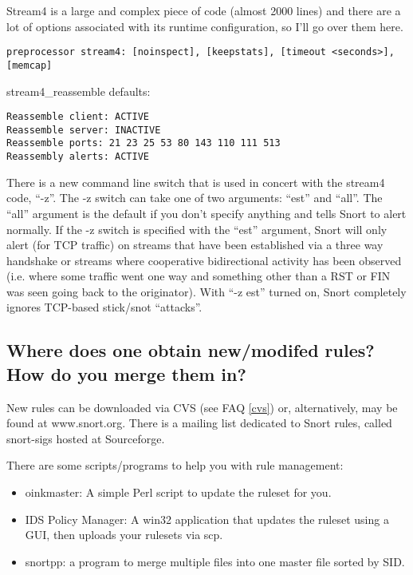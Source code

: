 \documentclass{article}
\newcommand{\myref}[1]{(see FAQ \ref{#1})}
\begin{document}
Stream4 is a large and complex piece of code (almost 2000 lines) and there are a lot of options associated with its runtime configuration, so I'll go over them here.

\begin{verbatim}
preprocessor stream4: [noinspect], [keepstats], [timeout <seconds>], [memcap]
\end{verbatim}

stream4\_reassemble defaults: 
\begin{verbatim}
Reassemble client: ACTIVE 
Reassemble server: INACTIVE 
Reassemble ports: 21 23 25 53 80 143 110 111 513 
Reassembly alerts: ACTIVE 
\end{verbatim}

There is a new command line switch that is used in concert with the
stream4 code, ``-z''.  The -z switch can take one of two arguments: ``est''
and ``all''.  The ``all'' argument is the default if you don't specify
anything and tells Snort to alert normally.  If the -z switch is
specified with the ``est'' argument, Snort will only alert (for TCP
traffic) on streams that have been established via a three way handshake
or streams where cooperative bidirectional activity has been observed
(i.e. where some traffic went one way and something other than a RST or
FIN was seen going back to the originator).  With ``-z est'' turned on,
Snort completely ignores TCP-based stick/snot ``attacks''.

\subsection{Where does one obtain new/modifed rules? How do you merge them in?}

New rules can be downloaded via CVS \myref{cvs} or, alternatively, may be 
found at www.snort.org. There is a mailing list dedicated to Snort rules, 
called snort-sigs hosted at Sourceforge.

There are some scripts/programs to help you with rule management:
\begin{itemize}
  \item oinkmaster: A simple Perl script to update the ruleset for you.


  \item IDS Policy Manager: A win32 application that updates the ruleset
    using a GUI, then uploads your rulesets via scp.


  \item snortpp: a program to merge multiple files into one master file sorted by
    SID.

\end{itemize}
\end{document}
